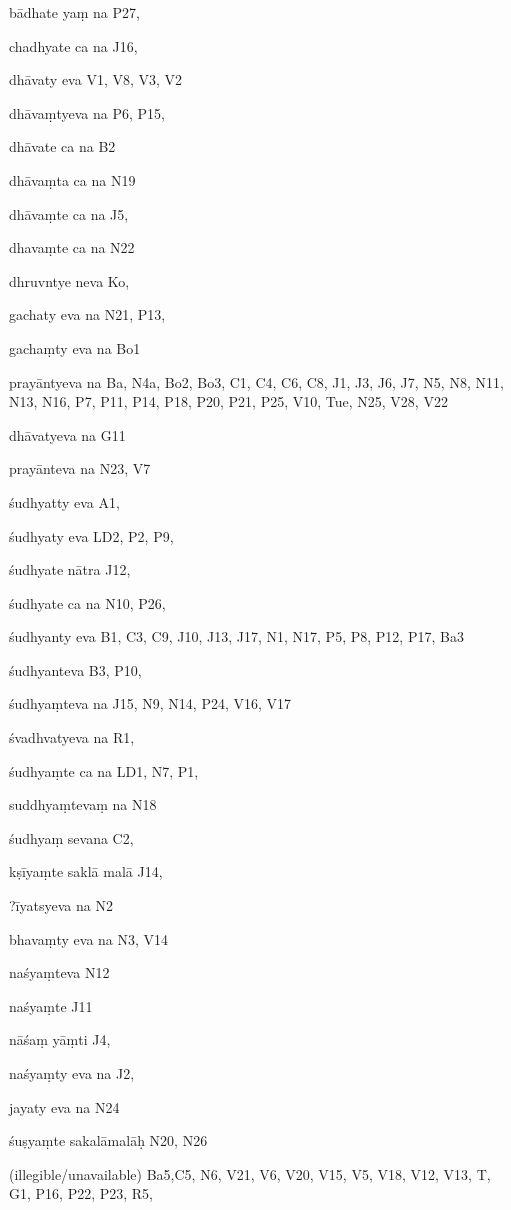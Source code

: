 \begin{marma}[hp02_009]
\begin{marma}[hp02_011]
 \begin{marma}[hp02_25d]
\item[bādhate yaṃ na] P27,
\item[chadhyate ca na] J16,
\item[dhāvaty eva] V1, V8, V3, V2
\item[dhāvaṃtyeva na] P6, P15, 
\item[dhāvate ca na] B2
\item[dhāvaṃta ca na] N19
\item[dhāvaṃte ca na] J5,
\item[dhavaṃte ca na] N22
\item[dhruvntye neva] Ko,
\item[gachaty eva na] N21, P13, 
\item[gachaṃty eva na] Bo1
\item[prayāntyeva na] Ba, N4a, Bo2, Bo3, C1, C4, C6, C8, J1, J3, J6, J7, N5, N8, N11, N13, N16, P7, P11, P14, P18, P20, P21, P25, V10, Tue, N25, V28, V22
\item[dhāvatyeva na] G11
\item[prayānteva na] N23, V7
\item[śudhyatty eva] A1,
\item[śudhyaty eva] LD2, P2, P9, 
\item[śudhyate nātra] J12,
\item[śudhyate ca na] N10, P26, 
\item[śudhyanty eva] B1, C3, C9, J10, J13, J17, N1, N17, P5, P8, P12, P17, Ba3
\item[śudhyanteva] B3, P10, 
\item[śudhyaṃteva na] J15, N9, N14, P24, V16, V17
\item[śvadhvatyeva na] R1,
\item[śudhyaṃte ca na] LD1, N7, P1, 
\item[suddhyaṃtevaṃ na] N18
\item[śudhyaṃ sevana] C2,
\item[kṣīyaṃte saklā malā] J14,
\item[?īyatsyeva na] N2
\item[bhavaṃty eva na] N3, V14
\item[naśyaṃteva] N12
\item[naśyaṃte] J11
\item[nāśaṃ yāṃti] J4, 
\item[naśyaṃty eva na] J2,
\item[jayaty eva na] N24
\item[śuṣyaṃte sakalāmalāḥ] N20, N26
\item[(illegible/unavailable)] Ba5,C5, N6, V21, V6, V20, V15, V5, V18, V12, V13, T, G1, P16, P22, P23, R5,
  \begin{description}


\end{description}
\end{marma}
\end{marma}
\end{marma}
